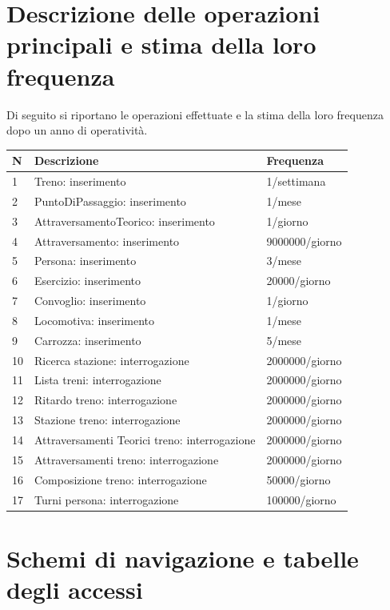 \documentclass[a4paper,12pt]{report}
\begin{document}
	\section{Descrizione delle operazioni principali e stima della loro frequenza}
	Di seguito si riportano le operazioni effettuate e la stima della loro frequenza dopo un anno di operatività.
	\begin{longtable}{|l|l|l|}
		\hline \textbf{N} & \textbf{Descrizione} & \textbf{Frequenza} \\
		\hline \endhead 1 & Treno: inserimento & 1/settimana \\
		\hline 2 & PuntoDiPassaggio: inserimento & 1/mese \\
		\hline 3 & AttraversamentoTeorico: inserimento & 1/giorno \\
		\hline 4 & Attraversamento: inserimento & 9000000/giorno \\
		\hline 5 & Persona: inserimento & 3/mese \\
		\hline 6 & Esercizio: inserimento & 20000/giorno \\
		\hline 7 & Convoglio: inserimento & 1/giorno \\
		\hline 8 & Locomotiva: inserimento & 1/mese \\
		\hline 9 & Carrozza: inserimento & 5/mese \\
		\hline 10 & Ricerca stazione: interrogazione & 2000000/giorno \\
		\hline 11 & Lista treni: interrogazione & 2000000/giorno \\
		\hline 12 & Ritardo treno: interrogazione & 2000000/giorno \\
		\hline 13 & Stazione treno: interrogazione & 2000000/giorno \\
		\hline 14 & Attraversamenti Teorici treno: interrogazione & 2000000/giorno \\
		\hline 15 & Attraversamenti treno: interrogazione & 2000000/giorno \\
		\hline 16 & Composizione treno: interrogazione & 50000/giorno \\
		\hline 17 & Turni persona: interrogazione & 100000/giorno \\
		\hline
	\end{longtable}
	\section{Schemi di navigazione e tabelle degli accessi}
\end{document}
